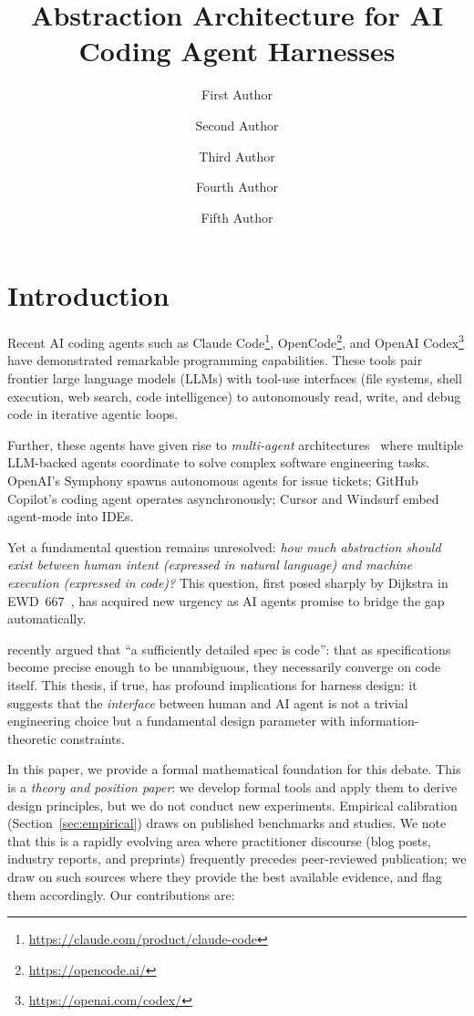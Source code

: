 \documentclass[11pt, a4paper, copyright]{googledeepmind}
\title{Abstraction Architecture for AI Coding Agent Harnesses}
\author[1]{First Author}
\author[2]{Second Author}
\author[2]{Third Author}
\author[1]{Fourth Author}
\author[1]{Fifth Author}
\affil[*]{Equal Contribution}
\affil[1]{Affiliation 1}
\affil[2]{Affiliation 2}
\begin{document}
\maketitle


\section{Introduction}

Recent AI coding agents such as Claude Code\footnote{\url{https://claude.com/product/claude-code}}, OpenCode\footnote{\url{https://opencode.ai/}}, and OpenAI Codex\footnote{\url{https://openai.com/codex/}} have demonstrated remarkable programming capabilities. These tools pair frontier large language models (LLMs) with tool-use interfaces (file systems, shell execution, web search, code intelligence) to autonomously read, write, and debug code in iterative agentic loops.

Further, these agents have given rise to \emph{multi-agent} architectures~\citep{kim2025scaling} where multiple LLM-backed agents coordinate to solve complex software engineering tasks. OpenAI's Symphony spawns autonomous agents for issue tickets; GitHub Copilot's coding agent operates asynchronously; Cursor and Windsurf embed agent-mode into IDEs.

Yet a fundamental question remains unresolved: \emph{how much abstraction should exist between human intent (expressed in natural language) and machine execution (expressed in code)?} This question, first posed sharply by Dijkstra in EWD~667~\citep{dijkstra1978foolishness}, has acquired new urgency as AI agents promise to bridge the gap automatically.

\citet{gonzalez2026spec} recently argued that ``a sufficiently detailed spec is code'': that as specifications become precise enough to be unambiguous, they necessarily converge on code itself. This thesis, if true, has profound implications for harness design: it suggests that the \emph{interface} between human and AI agent is not a trivial engineering choice but a fundamental design parameter with information-theoretic constraints.

In this paper, we provide a formal mathematical foundation for this debate. This is a \emph{theory and position paper}: we develop formal tools and apply them to derive design principles, but we do not conduct new experiments. Empirical calibration (Section~\ref{sec:empirical}) draws on published benchmarks and studies. We note that this is a rapidly evolving area where practitioner discourse (blog posts, industry reports, and preprints) frequently precedes peer-reviewed publication; we draw on such sources where they provide the best available evidence, and flag them accordingly. Our contributions are:
\end{document}
